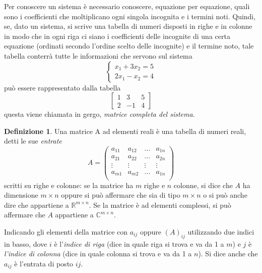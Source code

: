 \documentclass{book}
\theoremstyle{definition}
\newtheorem{defi}{Definizione}[section]
\theoremstyle{plain}
\begin{document}
Per conoscere un sistema è necessario conoscere, equazione per equazione,
quali sono i coefficienti che moltiplicano ogni singola incognita e i
termini noti. Quindi, se, dato un sistema, si scrive una tabella di
numeri disposti in righe e in colonne in modo che in ogni riga ci siano
i coefficienti delle incognite di una certa equazione (ordinati secondo
l'ordine scelto delle incognite) e il termine noto, tale tabella conterrà
tutte le informazioni che servono sul sistema
\begin{equation}
  \label{eq:matricediunsistlineare1}
  \begin{cases}
    x_1+3x_2=5\\
    2x_1-x_2=4
  \end{cases}
\end{equation}
può essere rappresentato dalla tabella
\begin{equation}
  \label{eq:matricediunsistlineare2}
  \begin{bmatrix}
    1 & 3 & 5\\
    2 & -1 & 4
  \end{bmatrix}
\end{equation}
questa viene chiamata in gergo, \textit{matrice completa del sistema}.
\begin{defi}
  \label{defi:matrice1}
  Una matrice A ad elementi reali è una tabella di numeri reali, detti le
  sue \textit{entrate}
  \begin{equation*}
    A=
    \begin{pmatrix}
      a_{11} & a_{12} & \dots & a_{1n}\\
      a_{21} & a_{22} & \dots & a_{2n}\\
      \vdots & \vdots & \vdots & \vdots\\
      a_{m1} & a_{m2} & \dots & a_{1n}\\
    \end{pmatrix}
  \end{equation*}
  scritti su righe e colonne: se la matrice ha $m$ righe e $n$ colonne,
  si dice che $A$ ha dimensione $m \times n$ oppure si può affermare che
  sia di tipo $m \times n$ o si può anche dire che appartiene a
  $\mathds{R}^{m \times n}$. Se la matrice è ad elementi complessi, si può
  affermare che $A$ appartiene a $\mathds{C}^{m \times n}$.

  Indicando gli elementi della matrice con $a_{ij}$ oppure $(A)_{ij}$
  utilizzando due indici in basso, dove $i$ è l'\textit{indice di riga}
  (dice in quale riga si trova e va da 1 a $m$) e $j$ è \textit{l'indice
    di colonna} (dice in quale colonna si trova e va da 1 a $n$). Si dice
  anche che $a_{ij}$ è l'entrata di posto $ij$.
\end{defi}
\end{document}
